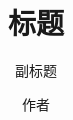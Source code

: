\documentclass{ctexbeamer}
\begin{document}
\title{标题}
\subtitle{副标题}
\author{作者}
\maketitle
\end{document}
